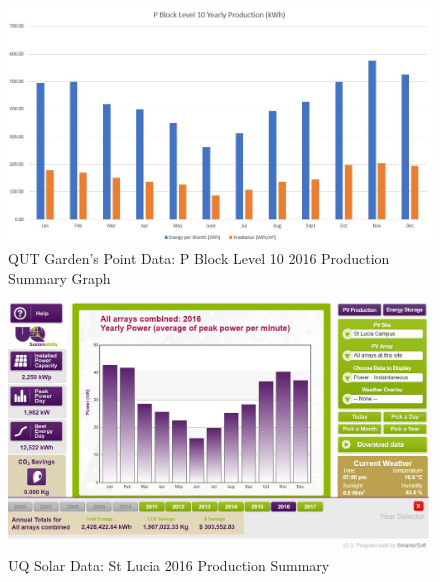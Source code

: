 \begin{figure}[H]
	\hfill\includegraphics[width = 150mm]{images/metering/meteo/p-block-lvl10-yearly-production}\hspace*{\fill}
	\caption{QUT Garden's Point Data: P Block Level 10 2016 Production Summary Graph} 
	\label{fig:qut-pv-lvl10-2016}
\end{figure}  

\begin{figure}[H]
	\hfill\includegraphics[width = 150mm]{images/metering/uq/St-Lucia-2016-Total}\hspace*{\fill}
	\caption{UQ Solar Data: St Lucia 2016 Production Summary \cite{website:UQData1}} 
	\label{fig:uq-pv-st-lucia-2016}
\end{figure} 

